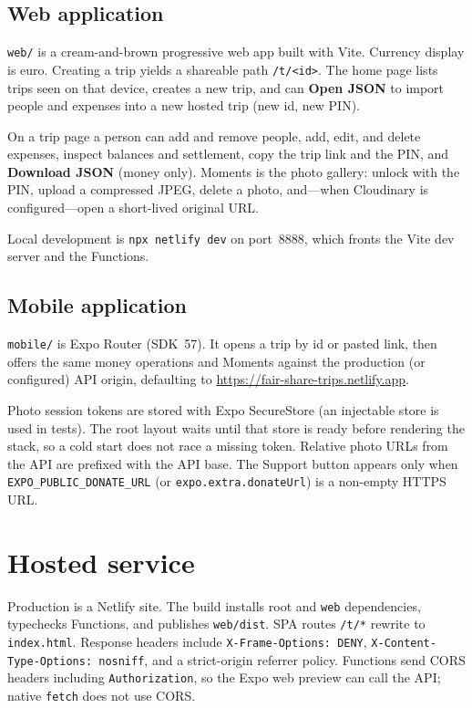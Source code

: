 \documentclass[11pt,a4paper]{article}
\newcommand{\code}[1]{\texttt{#1}}
\begin{document}
\subsection{Web application}

\code{web/} is a cream-and-brown progressive web app built with Vite.
Currency display is euro.
Creating a trip yields a shareable path \code{/t/<id>}.
The home page lists trips seen on that device, creates a new trip, and can \textbf{Open JSON} to import people and expenses into a new hosted trip (new id, new PIN).

On a trip page a person can add and remove people, add, edit, and delete expenses, inspect balances and settlement, copy the trip link and the PIN, and \textbf{Download JSON} (money only).
Moments is the photo gallery: unlock with the PIN, upload a compressed JPEG, delete a photo, and---when Cloudinary is configured---open a short-lived original URL.

Local development is \code{npx netlify dev} on port~8888, which fronts the Vite dev server and the Functions.

\subsection{Mobile application}

\code{mobile/} is Expo Router (SDK~57).
It opens a trip by id or pasted link, then offers the same money operations and Moments against the production (or configured) API origin, defaulting to \url{https://fair-share-trips.netlify.app}.

Photo session tokens are stored with Expo SecureStore (an injectable store is used in tests).
The root layout waits until that store is ready before rendering the stack, so a cold start does not race a missing token.
Relative photo URLs from the API are prefixed with the API base.
The Support button appears only when \code{EXPO\_PUBLIC\_DONATE\_URL} (or \code{expo.extra.donateUrl}) is a non-empty HTTPS URL.

\section{Hosted service}

Production is a Netlify site.
The build installs root and \code{web} dependencies, typechecks Functions, and publishes \code{web/dist}.
SPA routes \code{/t/*} rewrite to \code{index.html}.
Response headers include \code{X-Frame-Options: DENY}, \code{X-Content-Type-Options: nosniff}, and a strict-origin referrer policy.
Functions send CORS headers including \code{Authorization}, so the Expo web preview can call the API; native \code{fetch} does not use CORS.
\end{document}
